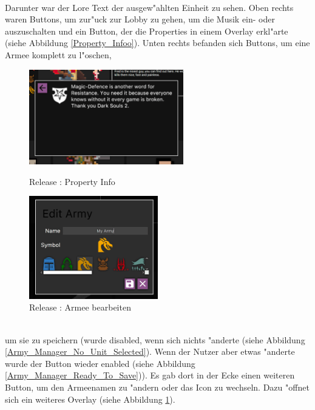 \documentclass[12pt, titlepage]{scrartcl}
\newcommand{\RN}[1]{%
	\textup{\uppercase\expandafter{\romannumeral#1}}%
}
\begin{document}
			    \ \\ Darunter war der Lore Text der ausgew"ahlten Einheit zu sehen. Oben rechts waren Buttons, um zur"uck zur Lobby zu gehen, um die Musik ein- oder auszuschalten und ein Button, der die Properties in einem Overlay erkl"arte (siehe Abbildung \ref{Property_Infoo}). Unten rechts befanden sich Buttons, um eine Armee komplett zu l"oschen, \\
			    \begin{figure}[H]
                    \centering
                    \begin{minipage}{0.6\textwidth}
                        \centering
                        \includegraphics[width=0.6\textwidth]{images/old_state/army_manager/PropertyInfo.png}
                        \caption{Release \RN{2}: Property Info}
                        \label{Property_Infoo}
                    \end{minipage}%
                    \begin{minipage}{0.5\textwidth}
                        \centering
                        \includegraphics[width=0.5\textwidth]{images/old_state/army_manager/EditArmy.png}
                        \caption{Release \RN{2}: Armee bearbeiten}
                        \label{Edit_Army}
                    \end{minipage}
                \end{figure}
                \ \\ um sie zu speichern (wurde disabled, wenn sich nichts "anderte (siehe Abbildung \ref{Army_Manager_No_Unit_Selected}). Wenn der Nutzer aber etwas "anderte wurde der Button wieder enabled (siehe Abbildung \ref{Army_Manager_Ready_To_Save})). Es gab dort in der Ecke einen weiteren Button, um den Armeenamen zu "andern oder das Icon zu wechseln. Dazu "offnet sich ein weiteres Overlay (siehe Abbildung \ref{Edit_Army}). \\
\end{document}
